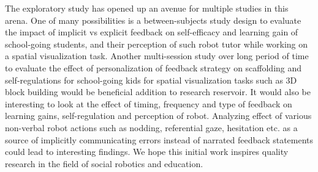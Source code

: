 The exploratory study has opened up an avenue for multiple studies in this arena. One of many possibilities is a between-subjects study design to evaluate the impact of implicit vs explicit feedback on self-efficacy and learning gain of school-going students, and their perception of such robot tutor while working on a spatial visualization task. Another multi-session study over long period of time to evaluate the effect of personalization of feedback strategy on scaffolding and self-regulations for school-going kids for spatial visualization tasks such as 3D block building would be beneficial addition to research reservoir. It would also be interesting to look at the effect of timing, frequency and type of feedback on learning gains, self-regulation and perception of robot. Analyzing effect of various non-verbal robot actions such as nodding, referential gaze, hesitation etc. as a source of implicitly communicating errors instead of narrated feedback statements could lead to interesting findings. We hope this initial work inspires quality research in the field of social robotics and education.  
